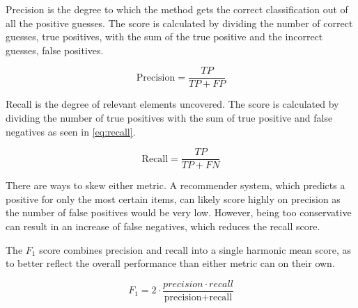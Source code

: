 Precision is the degree to which the method gets the correct classification out of all the positive guesses. The score is calculated by dividing the number of correct guesses, true positives, with the sum of the true positive and the incorrect guesses, false positives.

\begin{equation}\label{eq:precision}
	\text{Precision} = \frac{TP}{TP+FP}
\end{equation}

Recall is the degree of relevant elements uncovered. The score is calculated by dividing the number of true positives with the sum of true positive and false negatives as seen in \ref{eq:recall}.

\begin{equation}\label{eq:recall}
\text{Recall} = \frac{TP}{TP+FN}
\end{equation}

There are ways to skew either metric. A recommender system, which predicts a positive for only the most certain items, can likely score highly on precision as the number of false positives would be very low. However, being too conservative can result in an increase of false negatives, which reduces the recall score.

The $F_1$ score combines precision and recall into a single harmonic mean score, as to better reflect the overall performance than either metric can on their own.

\begin{equation}
	F_1 = 2 \cdot \frac{precision \cdot recall}{\text{precision} + \text{recall}}
\end{equation}